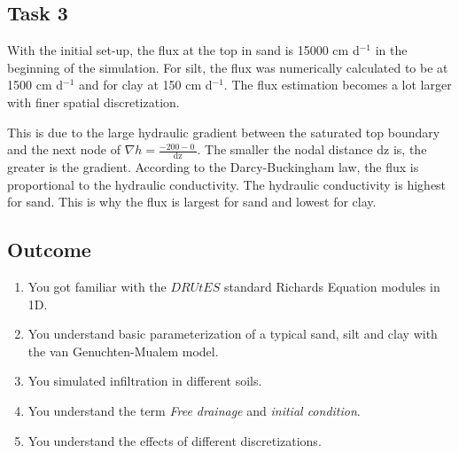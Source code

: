 \subsection*{Task 3}
With the initial set-up, the flux at the top in sand is 15000 cm d$^{-1}$ in the beginning of the simulation. For silt, the flux was numerically calculated to be at 1500 cm d$^{-1}$ and for clay at 150 cm d$^{-1}$. The flux estimation becomes a lot larger with finer spatial discretization.

 This is due to the large hydraulic gradient between the saturated top boundary and the next node of $\nabla h=\frac{-200-0~}{\mathrm{dz}}$. The smaller the nodal distance dz is, the greater is the gradient. According to the Darcy-Buckingham law, the flux is proportional to the hydraulic conductivity. The hydraulic conductivity is highest for sand. This is why the flux is largest for sand and lowest for clay.
\newpage
\newpage
\newpage
\newpage
\subsection{Outcome}
\begin{enumerate}
\item You got familiar with the $DRUtES$ standard Richards Equation modules in 1D.
\item You understand basic parameterization of a typical sand, silt and clay with the van Genuchten-Mualem model.
\item You simulated infiltration in different soils.
\item You understand the term \emph{Free drainage} and \emph{initial condition}.
\item You understand the effects of different discretizations.
\end{enumerate}
